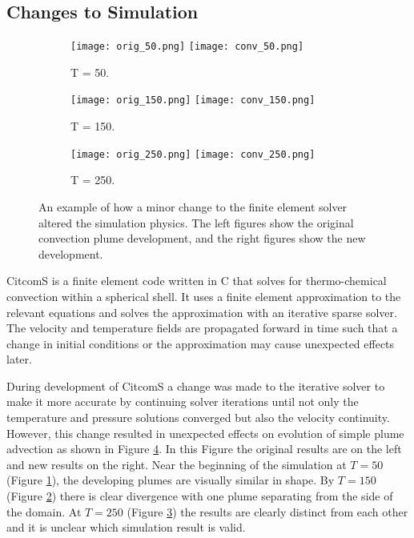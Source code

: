 \documentclass{acm_proc_article-sp}
\begin{document}
\subsection{Changes to Simulation}

\begin{figure}[!t]
\begin{subfigure}[h]{0.5\textwidth}
\centering
\texttt{[image: orig\_50.png]} \texttt{[image: conv\_50.png]}
\caption{T = 50.}
\label{fig-plume-comparison-a}
\end{subfigure}
\begin{subfigure}[b]{0.5\textwidth}
\centering
\texttt{[image: orig\_150.png]} \texttt{[image: conv\_150.png]}
\caption{T = 150.}
\label{fig-plume-comparison-b}
\end{subfigure}
\begin{subfigure}[b]{0.5\textwidth}
\centering
\texttt{[image: orig\_250.png]} \texttt{[image: conv\_250.png]}
\caption{T = 250.}
\label{fig-plume-comparison-c}
\end{subfigure}
\caption{An example of how a minor change to the finite element solver altered the simulation physics. The left figures show the original convection plume development, and the right figures show the new development.}
\label{fig-plume-comparison}
\end{figure}

CitcomS \cite{JGRB:JGRB12209,GGGE:GGGE831} is a finite element code written in C that solves for thermo-chemical convection within a spherical shell.  It uses a finite element approximation to the relevant equations and solves the approximation with an iterative sparse solver.  The velocity and temperature fields are propagated forward in time such that a change in initial conditions or the approximation may cause unexpected effects later.

During development of CitcomS a change was made to the iterative solver to make it more accurate by continuing solver iterations until not only the temperature and pressure solutions converged but also the velocity continuity. However, this change resulted in unexpected effects on evolution of simple plume advection as shown in Figure \ref{fig-plume-comparison}. In this Figure the original results are on the left and new results on the right.  Near the beginning of the simulation at $T=50$ (Figure \ref{fig-plume-comparison-a}), the developing plumes are visually similar in shape.  By $T=150$ (Figure \ref{fig-plume-comparison-b}) there is clear divergence with one plume separating from the side of the domain.  At $T=250$ (Figure \ref{fig-plume-comparison-c}) the results are clearly distinct from each other and it is unclear which simulation result is valid.
\end{document}
